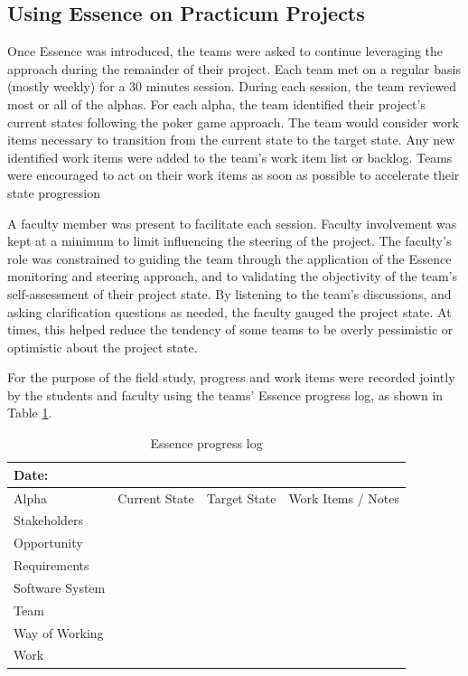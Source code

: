 \subsection{Using Essence on Practicum Projects}

Once Essence was introduced, the teams were asked to continue leveraging the approach during the remainder of their project. Each team met on a regular basis (mostly weekly) for a 30 minutes session. During each session, the team reviewed most or all of the alphas. For each alpha, the team identified their project's current states following the poker game approach. The team would consider work items necessary to transition from the current state to the target state. Any new identified work items were added to the team's work item list or backlog. Teams were encouraged to act on their work items as soon as possible to accelerate their state progression

A faculty member was present to facilitate each session. Faculty involvement was kept at a minimum to limit influencing the steering of the project. The faculty's role was constrained to guiding the team through the application of the Essence monitoring and steering approach, and to validating the objectivity of the team's self-assessment of their project state. By listening to the team's discussions, and asking clarification questions as needed, the faculty gauged the project state. At times, this helped reduce the tendency of some teams to be overly pessimistic or optimistic about the project state.

For the purpose of the field study, progress and work items were recorded jointly by the students and faculty using the teams' Essence progress log, as shown in Table \ref{EssenceProgressLog}.

\begin{table}[]
\centering
\caption{Essence progress log}
\renewcommand{\arraystretch}{1.4}
\label{EssenceProgressLog}
\begin{tabular}{|l|l|l|p{3.25in}|}
\hline
\multicolumn{4}{|l|}{Date:}                                         \\ \hline
\hline
Alpha           & Current State & Target State & Work Items / Notes \\
\hline
Stakeholders    &               &              &                    \\ \hline
Opportunity     &               &              &                    \\ \hline
Requirements    &               &              &                    \\ \hline
Software System &               &              &                    \\ \hline
Team            &               &              &                    \\ \hline
Way of Working  &               &              &                    \\ \hline
Work            &               &              &                    \\ \hline
\end{tabular}
\end{table}


